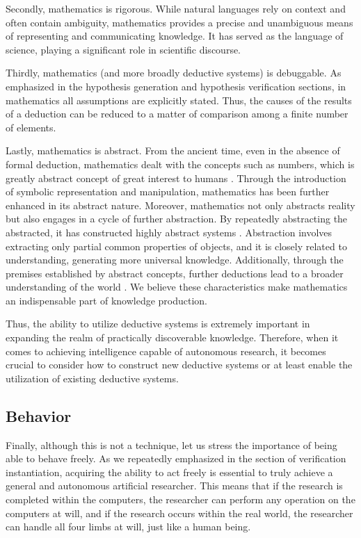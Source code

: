 \documentclass{book}
\begin{document}
Secondly, mathematics is rigorous. While natural languages rely on context and often contain ambiguity, mathematics provides a precise and unambiguous means of representing and communicating knowledge. It has served as the language of science, playing a significant role in scientific discourse.

Thirdly, mathematics (and more broadly deductive systems) is debuggable. As emphasized in the hypothesis generation and hypothesis verification sections, in mathematics all assumptions are explicitly stated. Thus, the causes of the results of a deduction can be reduced to a matter of comparison among a finite number of elements.

Lastly, mathematics is abstract. From the ancient time, even in the absence of formal deduction, mathematics dealt with the concepts such as numbers, which is greatly abstract concept of great interest to humans \cite{david2010history}. Through the introduction of symbolic representation and manipulation, mathematics has been further enhanced in its abstract nature. Moreover, mathematics not only abstracts reality but also engages in a cycle of further abstraction. By repeatedly abstracting the abstracted, it has constructed highly abstract systems \cite{bochner1968role}. Abstraction involves extracting only partial common properties of objects, and it is closely related to understanding, generating more universal knowledge. Additionally, through the premises established by abstract concepts, further deductions lead to a broader understanding of the world \cite{heisenberg2008abstraction}. We believe these characteristics make mathematics an indispensable part of knowledge production. 

Thus, the ability to utilize deductive systems is extremely important in expanding the realm of practically discoverable knowledge. Therefore, when it comes to achieving intelligence capable of autonomous research, it becomes crucial to consider how to construct new deductive systems or at least enable the utilization of existing deductive systems.

\subsection{Behavior}
Finally, although this is not a technique, let us stress the importance of being able to behave freely. As we repeatedly emphasized in the section of verification instantiation, acquiring the ability to act freely is essential to truly achieve a general and autonomous artificial researcher. This means that if the research is completed within the computers, the researcher can perform any operation on the computers at will, and if the research occurs within the real world, the researcher can handle all four limbs at will, just like a human being.
\end{document}

